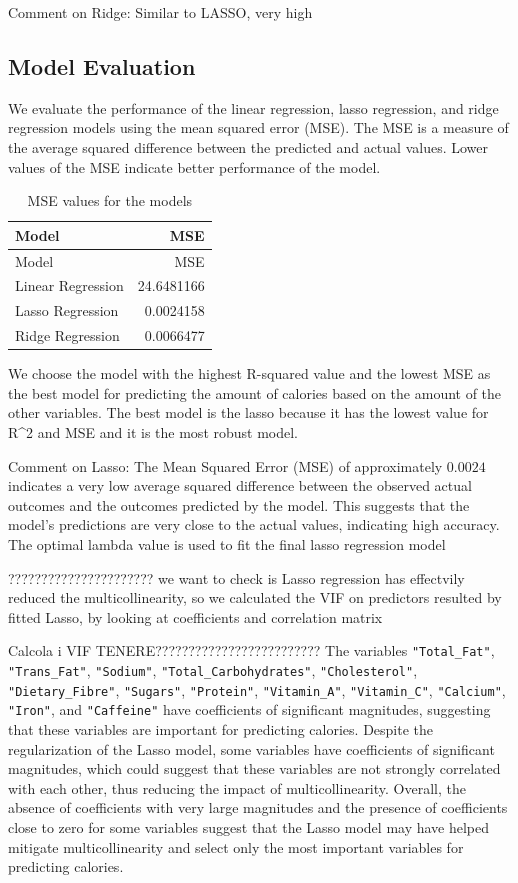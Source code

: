 \documentclass[
]{article}
\begin{document}
Comment on Ridge: Similar to LASSO, very high

\subsection{Model Evaluation}\label{model-evaluation}

We evaluate the performance of the linear regression, lasso regression,
and ridge regression models using the mean squared error (MSE). The MSE
is a measure of the average squared difference between the predicted and
actual values. Lower values of the MSE indicate better performance of
the model.

\begin{longtable}[]{@{}lr@{}}
\caption{MSE values for the models}\tabularnewline
\toprule\noalign{}
Model & MSE \\
\midrule\noalign{}
\endfirsthead
\toprule\noalign{}
Model & MSE \\
\midrule\noalign{}
\endhead
\bottomrule\noalign{}
\endlastfoot
Linear Regression & 24.6481166 \\
Lasso Regression & 0.0024158 \\
Ridge Regression & 0.0066477 \\
\end{longtable}

We choose the model with the highest R-squared value and the lowest MSE
as the best model for predicting the amount of calories based on the
amount of the other variables. The best model is the lasso because it
has the lowest value for R\^{}2 and MSE and it is the most robust model.

Comment on Lasso: The Mean Squared Error (MSE) of approximately
\(0.0024\) indicates a very low average squared difference between the
observed actual outcomes and the outcomes predicted by the model. This
suggests that the model's predictions are very close to the actual
values, indicating high accuracy. The optimal lambda value is used to
fit the final lasso regression model

?????????????????????? we want to check is Lasso regression has
effectvily reduced the multicollinearity, so we calculated the VIF on
predictors resulted by fitted Lasso, by looking at coefficients and
correlation matrix

Calcola i VIF TENERE????????????????????????? The variables
\texttt{"Total\_Fat"}, \texttt{"Trans\_Fat"}, \texttt{"Sodium"},
\texttt{"Total\_Carbohydrates"}, \texttt{"Cholesterol"},
\texttt{"Dietary\_Fibre"}, \texttt{"Sugars"}, \texttt{"Protein"},
\texttt{"Vitamin\_A"}, \texttt{"Vitamin\_C"}, \texttt{"Calcium"},
\texttt{"Iron"}, and \texttt{"Caffeine"} have coefficients of
significant magnitudes, suggesting that these variables are important
for predicting calories. Despite the regularization of the Lasso model,
some variables have coefficients of significant magnitudes, which could
suggest that these variables are not strongly correlated with each
other, thus reducing the impact of multicollinearity. Overall, the
absence of coefficients with very large magnitudes and the presence of
coefficients close to zero for some variables suggest that the Lasso
model may have helped mitigate multicollinearity and select only the
most important variables for predicting calories.
\end{document}
